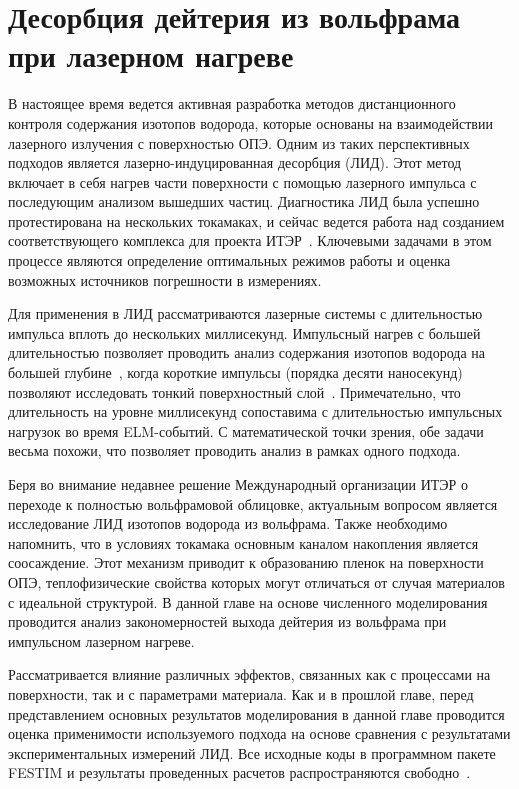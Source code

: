 \chapter{Десорбция дейтерия из вольфрама при лазерном нагреве}\label{ch:ch4}

В настоящее время ведется активная разработка методов дистанционного контроля содержания изотопов водорода, которые основаны на взаимодействии лазерного излучения с поверхностью ОПЭ. Одним из таких перспективных подходов является лазерно-индуцированная десорбция (ЛИД). Этот метод включает в себя нагрев части поверхности с помощью лазерного импульса с последующим анализом вышедших частиц. Диагностика ЛИД была успешно протестирована на нескольких токамаках, и сейчас ведется работа над созданием соответствующего комплекса для проекта ИТЭР~\cite{Zlobinski2024}. Ключевыми задачами в этом процессе являются определение оптимальных режимов работы и оценка возможных источников погрешности в измерениях.

Для применения в ЛИД рассматриваются лазерные системы с длительностью импульса вплоть до нескольких миллисекунд. Импульсный нагрев с большей длительностью позволяет проводить анализ содержания изотопов водорода на большей глубине~\cite{Yu2019, Zlobinski2020}, когда короткие импульсы (порядка десяти наносекунд) позволяют исследовать тонкий поверхностный слой~\cite{Gasparyan2021}. Примечательно, что длительность на уровне миллисекунд сопоставима с длительностью импульсных нагрузок во время ELM-событий. С математической точки зрения, обе задачи весьма похожи, что позволяет проводить анализ в рамках одного подхода.

Беря во внимание недавнее решение Международный организации ИТЭР о переходе к полностью вольфрамовой облицовке, актуальным вопросом является исследование ЛИД изотопов водорода из вольфрама. Также необходимо напомнить, что в условиях токамака основным каналом накопления является соосаждение. Этот механизм приводит к образованию пленок на поверхности ОПЭ, теплофизические свойства которых могут отличаться от случая материалов с идеальной структурой. В данной главе на основе численного моделирования проводится анализ закономерностей выхода дейтерия из вольфрама при импульсном лазерном нагреве.

Рассматривается влияние различных эффектов, связанных как с процессами на поверхности, так и с параметрами материала. Как и в прошлой главе, перед представлением основных результатов моделирования в данной главе проводится оценка применимости используемого подхода на основе сравнения с результатами экспериментальных измерений ЛИД. Все исходные коды в программном пакете FESTIM и результаты проведенных расчетов распространяются свободно~\cite{Kulagin_PhD_2025}.

